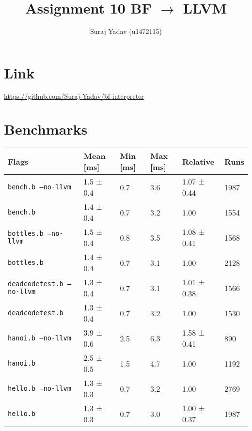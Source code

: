 \documentclass[11pt,answers]{exam}
\title{Assignment 10 BF $\rightarrow$ LLVM}
\author{Suraj Yadav (u1472115)}
\begin{document}
\maketitle
\section{Link}
\url{https://github.com/Suraj-Yadav/bf-interpreter}
\section{Benchmarks}
\begin{table}[H]
  \raggedright
  \begin{tabular}{|l|l|l|l|l|l|}
    \hline
    \textbf{Flags}                    & \textbf{Mean [ms]} & \textbf{Min [ms]} & \textbf{Max [ms]} & \textbf{Relative} & \textbf{Runs}\\ \hline
    \texttt{bench.b --no-llvm}        & 1.5 ± 0.4          & 0.7               & 3.6               & 1.07 ± 0.44       & 1987\\ \hline
    \texttt{bench.b}                  & 1.4 ± 0.4          & 0.7               & 3.2               & 1.00              & 1554\\ \hline\hline
    \texttt{bottles.b --no-llvm}      & 1.5 ± 0.4          & 0.8               & 3.5               & 1.08 ± 0.41       & 1568\\ \hline
    \texttt{bottles.b}                & 1.4 ± 0.4          & 0.7               & 3.1               & 1.00              & 2128\\ \hline\hline
    \texttt{deadcodetest.b --no-llvm} & 1.3 ± 0.4          & 0.7               & 3.1               & 1.01 ± 0.38       & 1566\\ \hline
    \texttt{deadcodetest.b}           & 1.3 ± 0.4          & 0.7               & 3.2               & 1.00              & 1530\\ \hline\hline
    \texttt{hanoi.b --no-llvm}        & 3.9 ± 0.6          & 2.5               & 6.3               & 1.58 ± 0.41       & 890\\ \hline
    \texttt{hanoi.b}                  & 2.5 ± 0.5          & 1.5               & 4.7               & 1.00              & 1192\\ \hline\hline
    \texttt{hello.b --no-llvm}        & 1.3 ± 0.3          & 0.7               & 3.2               & 1.00              & 2769\\ \hline
    \texttt{hello.b}                  & 1.3 ± 0.3          & 0.7               & 3.0               & 1.00 ± 0.37       & 1987\\ \hline\hline

\end{tabular}
\end{table}
\end{document}
